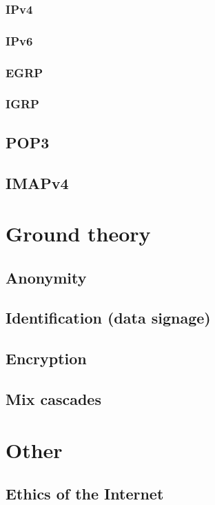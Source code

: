 \documentclass[11pt,a4paper]{book}
\begin{document}
\subsubsection{IPv4}
\cite{RFC760}
\cite{RFC791}
\cite{RFC1180}
\cite{RFC792}
\cite{RFC919}
\cite{RFC922}
\cite{RFC950}
\cite[p.~3]{RFC793}

\subsubsection{IPv6}
\cite{RFC2460}

\subsubsection{EGRP}
\subsubsection{IGRP}
\subsection{POP3}
\cite{RFC1939}

\subsection{IMAPv4}
\cite{RFC3501}

\section{Ground theory}
\subsection{Anonymity}
\subsection{Identification (data signage)}
\subsection{Encryption}
\subsection{Mix cascades}
\section{Other}
\subsection{Ethics of the Internet}
\cite[p.~1]{RFC1087}
\end{document}
